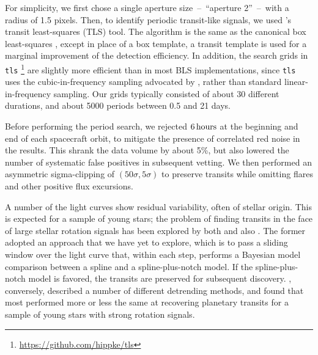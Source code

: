 \documentclass[12pt,twocolumn,tighten]{aastex62}
\begin{document}
For simplicity, we first chose a single aperture size~--~``aperture
2''~--~with a radius of 1.5  pixels.  Then, to identify periodic
transit-like signals, we used \citet{hippke_TLS_2019}'s transit
least-squares (TLS) tool.  The algorithm is the same as the canonical
box least-squares \citep{kovacs_box-fitting_2002}, except in place of
a box template, a transit template is used  for a marginal improvement
of the detection efficiency.  In addition, the search grids in
\texttt{tls} \footnote{\url{https://github.com/hippke/tls}} are
slightly more efficient than in most BLS implementations, since
\texttt{tls} uses the cubic-in-frequency sampling advocated by
\citet{ofir_optimizing_2014}, rather than standard linear-in-frequency
sampling.  Our grids typically consisted of about 30 different
durations, and about 5000 periods between 0.5 and 21 days. 

Before performing the period search, we rejected $6\,{\rm hours}$ at
the beginning and end of each spacecraft orbit, to mitigate the
presence of correlated red noise in the results.  This shrank the data
volume by about 5\%, but also lowered the number of systematic false
positives in subsequent vetting.  We then performed an asymmetric
sigma-clipping of $(50\sigma,5\sigma)$ to preserve transits while
omitting flares and other positive flux excursions. 

A number of the light curves show residual variability, often of
stellar origin.  This is expected for a sample of young stars; the
problem of finding transits in the face of large stellar rotation
signals has been explored by both \citet{rizzuto_zeitV_2017} and also
\citet{hippke_wotan_2019}.  The former adopted an approach that we
have yet to explore, which is to pass a sliding window over the light
curve that, within each step, performs a Bayesian model comparison
between a spline and a spline-plus-notch model.  If the
spline-plus-notch model is favored, the transits are preserved for
subsequent discovery.  \citet{hippke_wotan_2019}, conversely,
described a number of different detrending methods, and found that
most performed more or less the same at recovering planetary transits
for a sample of young stars with strong rotation signals.
\end{document}

